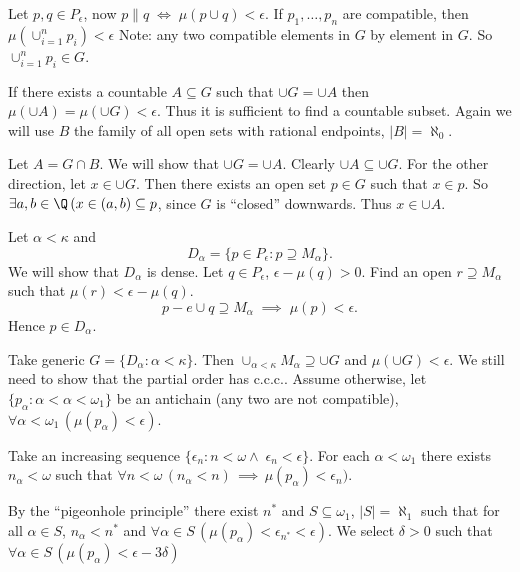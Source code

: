 \documentclass[11pt,pdftex,twoside,a4paper]{article}
\newcommand{\ccc}{c.c.c.}
\theoremstyle{definition}
\begin{document}
Let \(p,q\in P_\epsilon\), now \(p\| q\;\iff\; \mu(p\cup q)<\epsilon\).
If \(p_1,\ldots,p_n\) are compatible, then \(\mu(\cup_{i=1}^n p_i) < \epsilon\)
Note: any two compatible elements in $G$ by element in $G$.
So \(\cup_{i=1}^n p_i \in G\).

If there exists a countable \(A \subseteq G\) such that
\(\cup G = \cup A\) then \(\mu(\cup A) = \mu(\cup G) < \epsilon\).
Thus it is sufficient to find a countable subset.
Again we will use $B$ the family of all open sets with rational endpoints,
\(|B|=\aleph_0\).

Let \(A = G \cap B\). We will show that \(\cup G = \cup A\).
Clearly \(\cup A \subseteq \cup G\).
For the other direction, let \(x\in\cup G\).
Then there exists an open set \(p\in G\) such that \(x\in p\).
So \(\exists a,b\in\Q\,(x\in (a,b)\subseteq p\),
since $G$ is ``closed'' downwards. Thus \(x\in \cup A\).

Let \(\alpha<\kappa\) and 
\begin{equation*}
D_\alpha = \{p \in P_\epsilon : p \supseteq M_\alpha\}.
\end{equation*}
We will show that \(D_\alpha\) is dense.
Let \(q\in P_\epsilon\), \(\epsilon - \mu(q) > 0\).
Find an open \(r \supseteq M_\alpha\) such that \(\mu(r) < \epsilon - \mu(q)\).
\begin{equation*}
p - e \cup q \supseteq M_\alpha\;\implies\;\mu(p)<\epsilon.
\end{equation*}
Hence \(p\in D_\alpha\).

Take generic \(G = \{D_\alpha: \alpha < \kappa\}\).
Then \(\cup_{\alpha<\kappa}M_\alpha \supseteq \cup G\)
and \(\mu(\cup G)<\epsilon\).
We still need to show that the partial order has \ccc.
Assume otherwise, let \(\{p_\alpha: \alpha < \alpha < \omega_1\}\)
be an antichain (any two are not compatible),
\(\forall \alpha<\omega_1\,(\mu(p_\alpha)<\epsilon)\).

Take an increasing sequence
 \(\{\epsilon_n: n < \omega\land\; \epsilon_n<\epsilon\}\).
For each \(\alpha<\omega_1\) there exists \(n_\alpha<\omega\) 
such that 
 \(\forall n<\omega\,(n_\alpha<n)\,\implies\,\mu(p_\alpha)<\epsilon_n)\).

By the ``pigeonhole principle'' there exist \(n^*\) and \(S\subseteq \omega_1\),
\(|S|=\aleph_1\) such that for all \(\alpha \in S\), \(n_\alpha<n^*\)
and \(\forall \alpha\in S\,(\mu(p_\alpha)<\epsilon_{n^*} < \epsilon)\).
We select \(\delta>0\)  such that 
\(\forall\alpha\in S\,(\mu(p_\alpha) < \epsilon - 3\delta)\)
\end{document}
